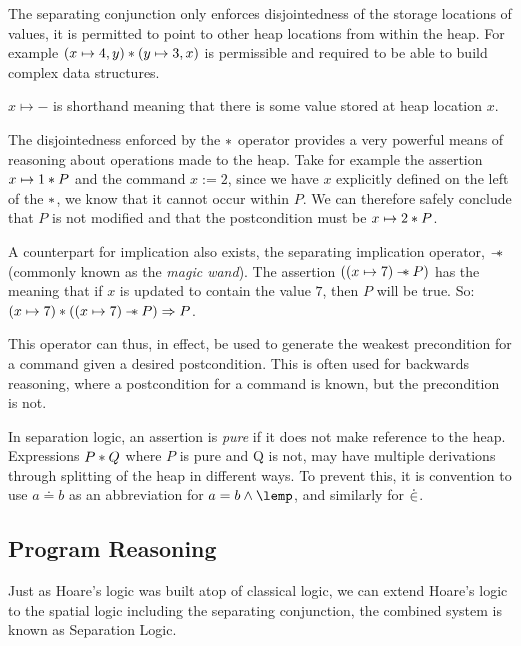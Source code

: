 \documentclass[a4paper,notitlepage]{report}
\begin{document}
  The separating conjunction only enforces disjointedness of the storage
  locations of values, it is permitted to point to other heap locations from
  within the heap. For example $(x \mapsto 4, y) \mathbin{*} (y \mapsto 3, x)$ is
  permissible and required to be able to build complex data structures.


  $x \mapsto -$ is shorthand meaning that there is some value stored at heap
  location $x$.

  The disjointedness enforced by the $\mathbin{*}$ operator provides a very powerful
  means of reasoning about operations made to the heap. Take for example the
  assertion $x \mapsto 1 \mathbin{*} P$ and the command $x := 2$, since we have $x$
  explicitly defined on the left of the $\mathbin{*}$, we know that it cannot occur
  within $P$. We can therefore safely conclude that $P$ is not modified and that
  the postcondition must be $x \mapsto 2 \mathbin{*} P$.

  A counterpart for implication also exists,
  the separating implication operator, $\mathbin{-\mkern-6mu *}$ (commonly known as the
  \emph{magic wand}). The assertion $((x
  \mapsto 7) \mathbin{-\mkern-6mu *} P)$ has the meaning that if $x$ is updated to contain the
  value $7$, then $P$ will be true. So: $(x \mapsto 7) \mathbin{*} ((x \mapsto 7) \mathbin{-\mkern-6mu *}
  P) \Rightarrow P$.

  This operator can thus, in effect, be
  used to generate the weakest precondition for a command given a desired
  postcondition. This is often used for backwards reasoning, where a
  postcondition for a command is known, but the precondition is not.

  In separation logic, an assertion is \emph{pure} if it does not make reference
  to the heap. Expressions $P \mathbin{*} Q$ where $P$ is pure and Q is not, may have
  multiple derivations through splitting of the heap in different ways. To
  prevent this, it is convention to use $a \doteq b$ as an abbreviation for
  $a = b \land \lemp$, and similarly for $\mathbin{\dot\in}$.

  \subsection{Program Reasoning}
  \label{subsec:programreasoning}

  Just as Hoare's logic was built atop of classical logic, we can extend
  Hoare's logic to the spatial logic including the separating conjunction,
  the combined system is known as Separation Logic.
\end{document}
